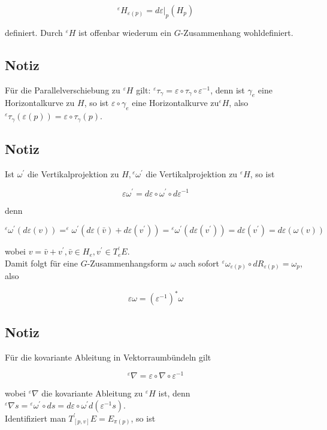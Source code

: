 \documentclass[10pt, letterpaper]{article}
\begin{document}
$$
{ }^{\varepsilon} H_{\varepsilon(p)}=\left.d \varepsilon\right|_{p}\left(H_{p}\right)
$$

definiert. Durch ${ }^{\varepsilon} H$ ist offenbar wiederum ein $G$-Zusammenhang wohldefiniert.

\subsection*{Notiz}
Für die Parallelverschiebung zu ${ }^{\varepsilon} H$ gilt: ${ }^{\varepsilon} \tau_{\gamma}=\varepsilon \circ \tau_{\gamma} \circ \varepsilon^{-1}$, denn ist $\gamma_{e}$ eine Horizontalkurve zu $H$, so ist $\varepsilon \circ \gamma_{e}$ eine Horizontalkurve $\mathrm{zu}^{\varepsilon} H$, also ${ }^{\varepsilon} \tau_{\gamma}(\varepsilon(p))= \varepsilon \circ \tau_{\gamma}(p)$.

\subsection*{Notiz}
Ist $\omega^{\prime}$ die Vertikalprojektion zu $H,{ }^{\varepsilon} \omega^{\prime}$ die Vertikalprojektion zu ${ }^{\varepsilon} H$, so ist

$$
\varepsilon \omega^{\prime}=d \varepsilon \circ \omega^{\prime} \circ d \varepsilon^{-1}
$$

denn

$$
{ }^{\varepsilon} \omega^{\prime}(d \varepsilon(v))=^{\varepsilon} \omega^{\prime}\left(d \varepsilon(\bar{v})+d \varepsilon\left(v^{\prime}\right)\right)={ }^{\varepsilon} \omega^{\prime}\left(d \varepsilon\left(v^{\prime}\right)\right)=d \varepsilon\left(v^{\prime}\right)=d \varepsilon(\omega(v))
$$

wobei $v=\bar{v}+v^{\prime}, \bar{v} \in H_{e}, v^{\prime} \in T_{e}^{\prime} E$.\\
Damit folgt für eine $G$-Zusammenhangsform $\omega$ auch sofort ${ }^{\varepsilon} \omega_{\varepsilon(p)} \circ d R_{\varepsilon(p)}=\omega_{p}$, also

$$
\varepsilon \omega=\left(\varepsilon^{-1}\right)^{*} \omega
$$

\subsection*{Notiz}
Für die kovariante Ableitung in Vektorraumbündeln gilt

$$
{ }^{\varepsilon} \nabla=\varepsilon \circ \nabla \circ \varepsilon^{-1}
$$

wobei ${ }^{\varepsilon} \nabla$ die kovariante Ableitung zu ${ }^{\varepsilon} H$ ist, denn ${ }^{\varepsilon} \nabla s={ }^{\varepsilon} \omega^{\prime} \circ d s=d \varepsilon \circ \omega^{\prime} d\left(\varepsilon^{-1} s\right)$.\\
Identifiziert man $T_{[p, v]}^{\prime} E=E_{\pi(p)}$, so ist
\end{document}
